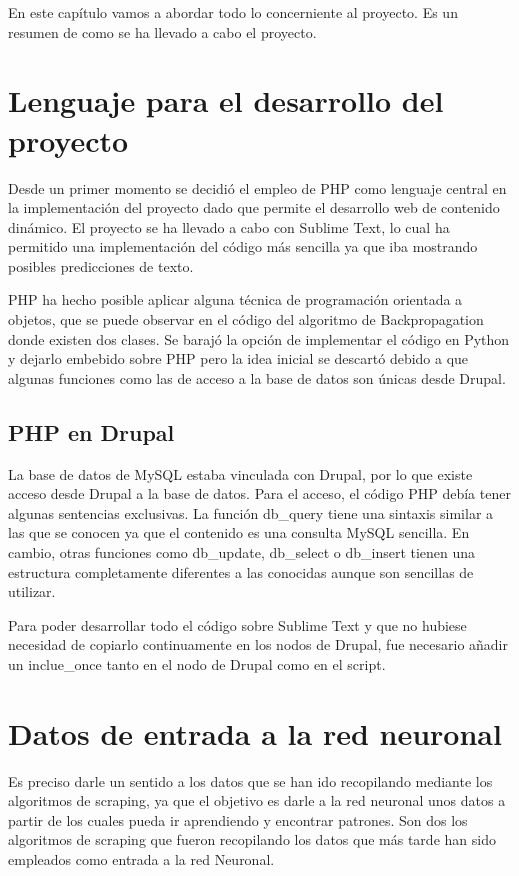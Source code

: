 
En este capítulo vamos a abordar todo lo concerniente al proyecto. Es un resumen de como se ha llevado a cabo el proyecto.
\section{Lenguaje para el desarrollo del proyecto}

Desde un primer momento se decidió el empleo de PHP como lenguaje central en la implementación del proyecto dado que permite el desarrollo web de contenido dinámico. El proyecto se ha llevado a cabo con Sublime Text, lo cual ha permitido una implementación del código más sencilla ya que iba mostrando posibles predicciones de texto.

PHP ha hecho posible aplicar alguna técnica de programación orientada a objetos, que se puede observar en el código del algoritmo de Backpropagation donde existen dos clases.
Se barajó la opción de implementar el código en Python y dejarlo embebido sobre PHP pero la idea inicial se descartó debido a que algunas funciones como las de acceso a la base de datos son únicas desde Drupal.

\subsection{PHP en Drupal}
La base de datos de MySQL estaba vinculada con Drupal, por lo que existe acceso desde Drupal a la base de datos. Para el acceso, el código PHP debía tener algunas sentencias exclusivas. La función db\_query tiene una sintaxis similar a las que se conocen ya que el contenido es una consulta MySQL sencilla. En cambio, otras funciones como db\_update, db\_select o db\_insert tienen una estructura completamente diferentes a las conocidas aunque son sencillas de utilizar.

Para poder desarrollar todo el código sobre Sublime Text y que no hubiese necesidad de copiarlo continuamente en los nodos de Drupal, fue necesario añadir un inclue\_once tanto en el nodo de Drupal como en el script.

\section{Datos de entrada a la red neuronal}
Es preciso darle un sentido a los datos que se han ido recopilando mediante los algoritmos de scraping, ya que el objetivo es darle a la red neuronal unos datos a partir de los cuales pueda ir aprendiendo y encontrar patrones. Son dos los algoritmos de scraping que fueron recopilando los datos que más tarde han sido empleados como entrada a la red Neuronal.

